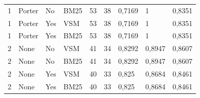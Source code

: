 \begin{table}[h]
{\begin{tabular}{lllllllll}
\rowcolor[HTML]{EFEFEF} 
1                                   & Porter                         & No                               & BM25                            & 53                               & 38                              & 0,7169                           & 1                             & 0,8351                         \\
\rowcolor[HTML]{EFEFEF} 
1                                   & Porter                         & Yes                              & VSM                             & 53                               & 38                              & 0,7169                           & 1                             & 0,8351                         \\
\rowcolor[HTML]{EFEFEF} 
1                                   & Porter                         & Yes                              & BM25                            & 53                               & 38                              & 0,7169                           & 1                             & 0,8351                         \\
\rowcolor[HTML]{C0C0C0} 
2                                   & None                           & No                               & VSM                             & 41                               & 34                              & 0,8292                           & 0,8947                        & 0,8607                         \\
\rowcolor[HTML]{C0C0C0} 
2                                   & None                           & No                               & BM25                            & 41                               & 34                              & 0,8292                           & 0,8947                        & 0,8607                         \\
\rowcolor[HTML]{C0C0C0} 
2                                   & None                           & Yes                              & VSM                             & 40                               & 33                              & 0,825                            & 0,8684                        & 0,8461                         \\
\rowcolor[HTML]{C0C0C0} 
2                                   & None                           & Yes                              & BM25                            & 40                               & 33                              & 0,825                            & 0,8684                        & 0,8461                         \\

\end{tabular}}
\end{table}
